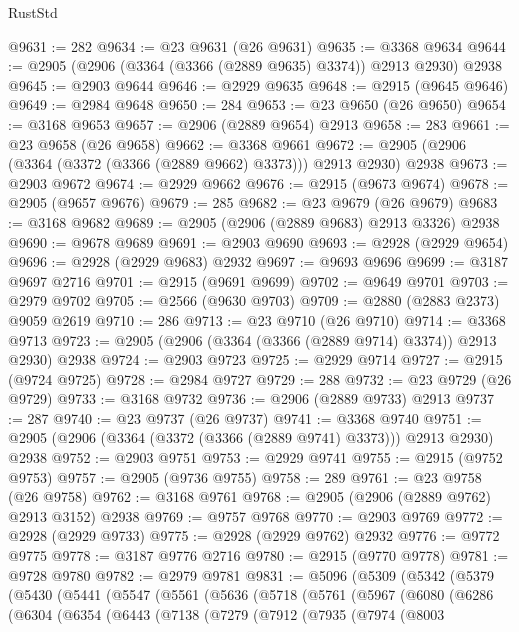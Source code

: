 \begin{lexlean}{RustStd}
\begin{coremodule}
@9631 := 282
@9634 := @23 @9631 (@26 @9631)
@9635 := @3368 @9634
@9644 := @2905 (@2906 (@3364 (@3366 (@2889 @9635) @3374)) @2913 @2930) @2938
@9645 := @2903 @9644
@9646 := @2929 @9635
@9648 := @2915 (@9645 @9646)
@9649 := @2984 @9648
@9650 := 284
@9653 := @23 @9650 (@26 @9650)
@9654 := @3168 @9653
@9657 := @2906 (@2889 @9654) @2913
@9658 := 283
@9661 := @23 @9658 (@26 @9658)
@9662 := @3368 @9661
@9672 := @2905 (@2906 (@3364 (@3372 (@3366 (@2889 @9662) @3373))) @2913 @2930) @2938
@9673 := @2903 @9672
@9674 := @2929 @9662
@9676 := @2915 (@9673 @9674)
@9678 := @2905 (@9657 @9676)
@9679 := 285
@9682 := @23 @9679 (@26 @9679)
@9683 := @3168 @9682
@9689 := @2905 (@2906 (@2889 @9683) @2913 @3326) @2938
@9690 := @9678 @9689
@9691 := @2903 @9690
@9693 := @2928 (@2929 @9654)
@9696 := @2928 (@2929 @9683) @2932
@9697 := @9693 @9696
@9699 := @3187 @9697 @2716
@9701 := @2915 (@9691 @9699)
@9702 := @9649 @9701
@9703 := @2979 @9702
@9705 := @2566 (@9630 @9703)
@9709 := @2880 (@2883 @2373) @9059 @2619
@9710 := 286
@9713 := @23 @9710 (@26 @9710)
@9714 := @3368 @9713
@9723 := @2905 (@2906 (@3364 (@3366 (@2889 @9714) @3374)) @2913 @2930) @2938
@9724 := @2903 @9723
@9725 := @2929 @9714
@9727 := @2915 (@9724 @9725)
@9728 := @2984 @9727
@9729 := 288
@9732 := @23 @9729 (@26 @9729)
@9733 := @3168 @9732
@9736 := @2906 (@2889 @9733) @2913
@9737 := 287
@9740 := @23 @9737 (@26 @9737)
@9741 := @3368 @9740
@9751 := @2905 (@2906 (@3364 (@3372 (@3366 (@2889 @9741) @3373))) @2913 @2930) @2938
@9752 := @2903 @9751
@9753 := @2929 @9741
@9755 := @2915 (@9752 @9753)
@9757 := @2905 (@9736 @9755)
@9758 := 289
@9761 := @23 @9758 (@26 @9758)
@9762 := @3168 @9761
@9768 := @2905 (@2906 (@2889 @9762) @2913 @3152) @2938
@9769 := @9757 @9768
@9770 := @2903 @9769
@9772 := @2928 (@2929 @9733)
@9775 := @2928 (@2929 @9762) @2932
@9776 := @9772 @9775
@9778 := @3187 @9776 @2716
@9780 := @2915 (@9770 @9778)
@9781 := @9728 @9780
@9782 := @2979 @9781
@9831 := @5096
    (@5309
      (@5342
        (@5379
          (@5430
            (@5441
              (@5547
                (@5561
                  (@5636
                    (@5718
                      (@5761
                        (@5967
                          (@6080
                            (@6286
                              (@6304
                                (@6354
                                  (@6443
                                    (@7138
                                      (@7279
                                        (@7912
                                          (@7935
                                            (@7974
                                              (@8003

\end{coremodule}
\end{lexlean}

